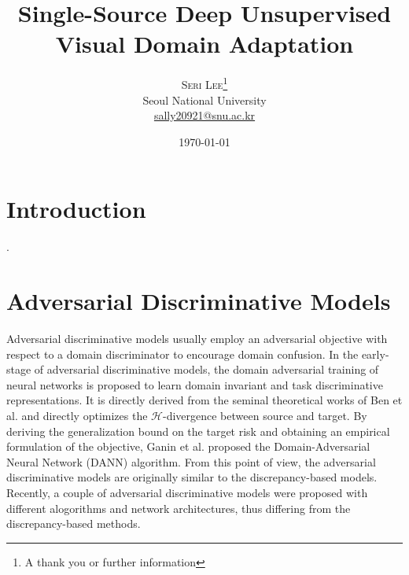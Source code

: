 \documentclass[twoside,twocolumn]{article}
\title{Single-Source Deep Unsupervised Visual Domain Adaptation} %
\author{%
\textsc{Seri Lee}\thanks{A thank you or further information} \\[1ex] %
\normalsize Seoul National University \\ %
\normalsize \href{mailto:sally20921@snu.ac.kr}{sally20921@snu.ac.kr} %
}
\date{\today} %
\begin{document}
\maketitle


\section{Introduction}
\cite{b1}.

\section{Adversarial Discriminative Models}
Adversarial discriminative models usually employ an adversarial objective with respect to a domain discriminator to encourage domain confusion.
In the early-stage of adversarial discriminative models, the domain adversarial training of neural networks is proposed to learn domain invariant and task discriminative representations.
It is directly derived from the seminal theoretical works of Ben et al. and directly optimizes the $\mathcal{H}$-divergence between source and target.
By deriving the generalization bound on the target risk and obtaining an empirical formulation of the objective,
Ganin et al. proposed the Domain-Adversarial Neural Network (DANN) algorithm. From this point of view, the adversarial discriminative models are originally similar to the discrepancy-based models.
Recently, a couple of adversarial discriminative models were proposed with different alogorithms and network architectures, thus differing from the discrepancy-based methods.





\end{document}
